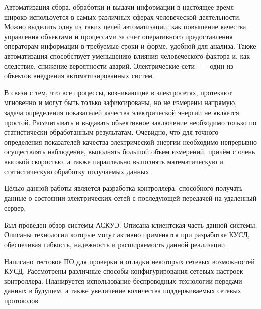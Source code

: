\documentclass[utf8x,14pt, coursreport]{G7-32}
\begin{document}
\Introduction
Автоматизация сбора, обработки и выдачи информации в настоящее время широко используется в самых различных сферах человеческой деятельности. Можно выделить одну из таких целей автоматизации, как повышение качества управления объектами и процессами за счет оперативного предоставления операторам информации в требуемые сроки и форме, удобной для анализа. Также автоматизация способствует уменьшению влияния человеческого фактора и, как следствие, снижение вероятности аварий. Электрические сети ~--- один из объектов внедрения автоматизированных систем.

В связи с тем, что все процессы, возникающие в электросетях, протекают мгновенно и могут быть только зафиксированы, но не измерены напрямую, задача определения показателей качества электрической энергии не является простой. Расcчитывать и выдавать объективное заключение необходимо только по статистически обработанным результатам. Очевидно, что для точного определения показателей качества электрической энергии необходимо непрерывно осуществлять наблюдение, выполнять большой объем измерений, причём с очень высокой скоростью, а также параллельно выполнять математическую и статистическую обработку получаемых данных.\cite{qualitymonitor}

Целью данной работы является разработка контроллера, способного получать данные о состоянии электрических сетей с последующей передачей на удаленный сервер.


\mainmatter %











\backmatter %


\Conclusion

Был проведен обзор системы АСКУЭ. Описана клиентская часть данной системы. Описаны технологии которые могут активно применятся при разработке КУСД, обеспечивая гибкость, надежность и расширяемость данной реализации.

Написано тестовое ПО для проверки и отладки некоторых сетевых возможностей КУСД. Рассмотрены различные способы конфигурирования сетевых настроек контроллера. Планируется использование беспроводных технологии передачи данных в будущем, а также увеличение количества поддерживаемых сетевых протоколов.
\end{document}

